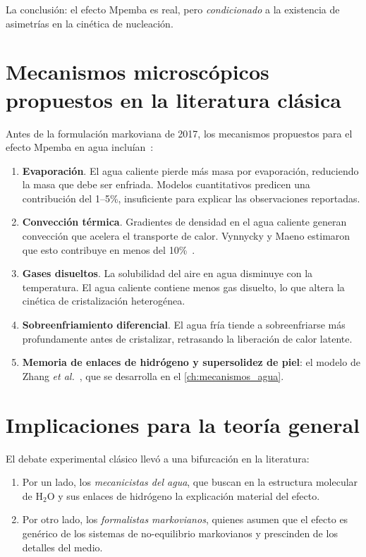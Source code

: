 \noindent La conclusión: el efecto Mpemba es real, pero \emph{condicionado} a la 
existencia de asimetrías en la cinética de nucleación.

\section{Mecanismos microscópicos propuestos en la literatura clásica}

Antes de la formulación markoviana de 2017, los mecanismos propuestos para el 
efecto Mpemba en agua incluían~\cite{burridge2016, hallstadius2020}:

\begin{enumerate}
\item \textbf{Evaporación}. El agua caliente pierde más masa por evaporación, 
reduciendo la masa que debe ser enfriada. Modelos cuantitativos predicen una 
contribución del 1--5\%, insuficiente para explicar las observaciones reportadas.
\item \textbf{Convección térmica}. Gradientes de densidad en el agua caliente 
generan convección que acelera el transporte de calor. Vynnycky y Maeno 
estimaron que esto contribuye en menos del 10\%~\cite{burridge2016}.
\item \textbf{Gases disueltos}. La solubilidad del aire en agua disminuye con la 
temperatura. El agua caliente contiene menos gas disuelto, lo que altera la 
cinética de cristalización heterogénea.
\item \textbf{Sobreenfriamiento diferencial}. El agua fría tiende a sobreenfriarse 
más profundamente antes de cristalizar, retrasando la liberación de calor 
latente.
\item \textbf{Memoria de enlaces de hidrógeno y supersolidez de piel}: el modelo 
de Zhang \emph{et al.}~\cite{zhang2014}, que se desarrolla en el 
\cref{ch:mecanismos_agua}.
\end{enumerate}

\section{Implicaciones para la teoría general}

El debate experimental clásico llevó a una bifurcación en la literatura:

\begin{enumerate}
\item Por un lado, los \emph{mecanicistas del agua}, que buscan en la estructura 
molecular de $\mathrm{H_2O}$ y sus enlaces de hidrógeno la explicación 
material del efecto.
\item Por otro lado, los \emph{formalistas markovianos}, quienes asumen que el 
efecto es genérico de los sistemas de no-equilibrio markovianos y prescinden de 
los detalles del medio.
\end{enumerate}

